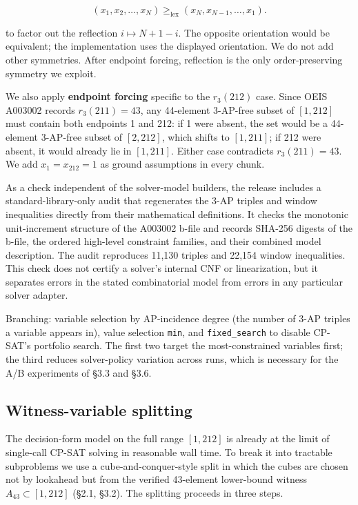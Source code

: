 \[
  (x_1,x_2,\ldots,x_N) \geq_{\mathrm{lex}}
  (x_N,x_{N-1},\ldots,x_1).
\]

to factor out the reflection $i \mapsto N+1-i$. The opposite orientation would
be equivalent; the implementation uses the displayed orientation. We do not add other
symmetries. After endpoint forcing, reflection is the only order-preserving
symmetry we exploit.

We also apply \textbf{endpoint forcing} specific to the $r_3(212)$ case.
Since OEIS A003002 records $r_3(211) = 43$, any 44-element
3-AP-free subset of $[1, 212]$ must contain both endpoints 1
and 212: if 1 were absent, the set would be a 44-element
3-AP-free subset of $[2, 212]$, which shifts to $[1, 211]$; if 212
were absent, it would already lie in $[1, 211]$. Either case contradicts
$r_3(211) = 43$. We add $x_1=x_{212}=1$ as ground assumptions in
every chunk.

As a check independent of the solver-model builders, the release includes a
standard-library-only audit that regenerates the 3-AP triples and window
inequalities directly from their mathematical definitions.  It checks the
monotonic unit-increment structure of the A003002 b-file and records SHA-256
digests of the b-file, the ordered high-level constraint families, and their
combined model description.  The audit reproduces 11,130 triples and 22,154
window inequalities.  This check does not certify a solver's internal CNF or
linearization, but it separates errors in the stated combinatorial model from
errors in any particular solver adapter.

Branching: variable selection by AP-incidence degree (the number of
3-AP triples a variable appears in), value selection \texttt{min}, and
\texttt{fixed\_search} to disable CP-SAT's portfolio search. The first two
target the most-constrained variables first; the third reduces solver-policy
variation across runs, which is necessary for the A/B experiments of §3.3
and §3.6.

\subsection{Witness-variable splitting}\label{witness-variable-splitting}

The decision-form model on the full range $[1, 212]$ is already at
the limit of single-call CP-SAT solving in reasonable wall time. To
break it into tractable subproblems we use a cube-and-conquer-style split
\cite{heule-kullmann-wieringa-biere-2012} in which the cubes are chosen
not by lookahead but from the verified 43-element
lower-bound witness $A_{43} \subset [1,212]$ (§2.1, §3.2). The
splitting proceeds in three steps.

